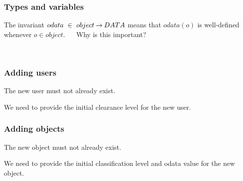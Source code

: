 \documentclass{beamer}
\begin{document}
\begin{frame}
\frametitle{Types and variables}


%
%


The \alert{invariant} $odata ~\in~ object \mathbin\rightarrow DATA$  means that $odata(o)$ is
well-defined whenever $o\in object$.  ~~ Why is this important?

~


\end{frame}





\begin{frame}

\frametitle{Adding users}


The new user must not already exist.

We need to provide the initial clearance level for the new user.
\end{frame}




\begin{frame}

\frametitle{Adding objects}


The new object must not already exist.

We need to provide the initial classification level and odata value
for the new object.

\end{frame}
\end{document}
